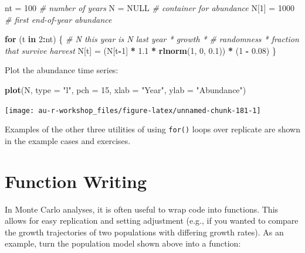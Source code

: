 \documentclass[]{book}
\newenvironment{Shaded}{\begin{snugshade}}{\end{snugshade}}
\newcommand{\KeywordTok}[1]{\textcolor[rgb]{0.13,0.29,0.53}{\textbf{#1}}}
\newcommand{\DataTypeTok}[1]{\textcolor[rgb]{0.13,0.29,0.53}{#1}}
\newcommand{\DecValTok}[1]{\textcolor[rgb]{0.00,0.00,0.81}{#1}}
\newcommand{\FloatTok}[1]{\textcolor[rgb]{0.00,0.00,0.81}{#1}}
\newcommand{\StringTok}[1]{\textcolor[rgb]{0.31,0.60,0.02}{#1}}
\newcommand{\CommentTok}[1]{\textcolor[rgb]{0.56,0.35,0.01}{\textit{#1}}}
\newcommand{\OtherTok}[1]{\textcolor[rgb]{0.56,0.35,0.01}{#1}}
\newcommand{\ControlFlowTok}[1]{\textcolor[rgb]{0.13,0.29,0.53}{\textbf{#1}}}
\newcommand{\OperatorTok}[1]{\textcolor[rgb]{0.81,0.36,0.00}{\textbf{#1}}}
\newcommand{\NormalTok}[1]{#1}
\theoremstyle{definition}
\theoremstyle{definition}
\theoremstyle{definition}
\theoremstyle{remark}
\begin{document}
\begin{Shaded}
\begin{Highlighting}[]
\NormalTok{nt =}\StringTok{ }\DecValTok{100}       \CommentTok{# number of years}
\NormalTok{N =}\StringTok{ }\OtherTok{NULL}       \CommentTok{# container for abundance}
\NormalTok{N[}\DecValTok{1}\NormalTok{] =}\StringTok{ }\DecValTok{1000}    \CommentTok{# first end-of-year abundance}

\ControlFlowTok{for}\NormalTok{ (t }\ControlFlowTok{in} \DecValTok{2}\OperatorTok{:}\NormalTok{nt) \{}
  \CommentTok{# N this year is N last year * growth *}
    \CommentTok{# randomness * fraction that survive harvest}
\NormalTok{  N[t] =}\StringTok{ }\NormalTok{(N[t}\OperatorTok{-}\DecValTok{1}\NormalTok{] }\OperatorTok{*}\StringTok{ }\FloatTok{1.1} \OperatorTok{*}\StringTok{ }\KeywordTok{rlnorm}\NormalTok{(}\DecValTok{1}\NormalTok{, }\DecValTok{0}\NormalTok{, }\FloatTok{0.1}\NormalTok{)) }\OperatorTok{*}\StringTok{ }\NormalTok{(}\DecValTok{1} \OperatorTok{-}\StringTok{ }\FloatTok{0.08}\NormalTok{)}
\NormalTok{\}}
\end{Highlighting}
\end{Shaded}

Plot the abundance time series:

\begin{Shaded}
\begin{Highlighting}[]
\KeywordTok{plot}\NormalTok{(N, }\DataTypeTok{type =} \StringTok{"l"}\NormalTok{, }\DataTypeTok{pch =} \DecValTok{15}\NormalTok{, }\DataTypeTok{xlab =} \StringTok{"Year"}\NormalTok{, }\DataTypeTok{ylab =} \StringTok{"Abundance"}\NormalTok{)}
\end{Highlighting}
\end{Shaded}

\begin{center}\texttt{[image: au-r-workshop\_files/figure-latex/unnamed-chunk-181-1]} \end{center}

Examples of the other three utilities of using \texttt{for()} loops over
replicate are shown in the example cases and exercises.

\section{Function Writing}\label{adv-funcs}

In Monte Carlo analyses, it is often useful to wrap code into functions.
This allows for easy replication and setting adjustment (e.g., if you
wanted to compare the growth trajectories of two populations with
differing growth rates). As an example, turn the population model shown
above into a function:
\end{document}
